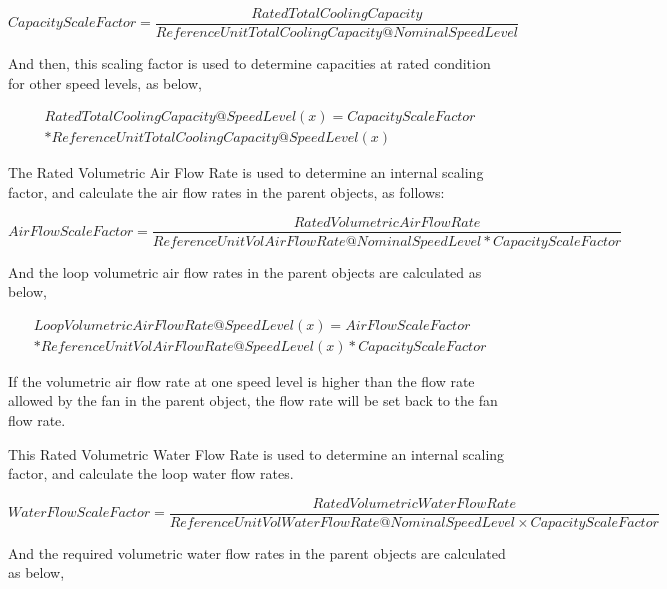 \begin{equation}
CapacityScaleFactor = \frac{{RatedTotalCoolingCapacity}}{{ReferenceUnitTotalCoolingCapacity@NominalSpeedLevel}}
\end{equation}

And then, this scaling factor is used to determine capacities at rated condition for other speed levels, as below,

\begin{equation}
\begin{split}
  RatedTotalCoolingCapacity@SpeedLevel(x) = CapacityScaleFactor \\
  * ReferenceUnitTotalCoolingCapacity@SpeedLevel(x)
\end{split}
\end{equation}

The Rated Volumetric Air Flow Rate is used to determine an internal scaling factor, and calculate the air flow rates in the parent objects, as follows:

{\scriptsize
\begin{equation}
  AirFlowScaleFactor = \frac{RatedVolumetricAirFlowRate}{ReferenceUnitVolAirFlowRate@NominalSpeedLevel * CapacityScaleFactor}
\end{equation}}

And the loop volumetric air flow rates in the parent objects are calculated as below,

\begin{equation}
\begin{split}
  LoopVolumetricAirFlowRate@SpeedLevel\left( x \right) = AirFlowScaleFactor \\
  * ReferenceUnitVolAirFlowRate@SpeedLevel(x) * CapacityScaleFactor
\end{split}
\end{equation}

If the volumetric air flow rate at one speed level is higher than the flow rate allowed by the fan in the parent object, the flow rate will be set back to the fan flow rate.

This Rated Volumetric Water Flow Rate is used to determine an internal scaling factor, and calculate the loop water flow rates.

{\scriptsize
\begin{equation}
  WaterFlowScaleFactor = \frac{{RatedVolumetricWaterFlowRate}}{{ReferenceUnitVolWaterFlowRate@NominalSpeedLevel \times CapacityScaleFactor}}
\end{equation}}

And the required volumetric water flow rates in the parent objects are calculated as below,

